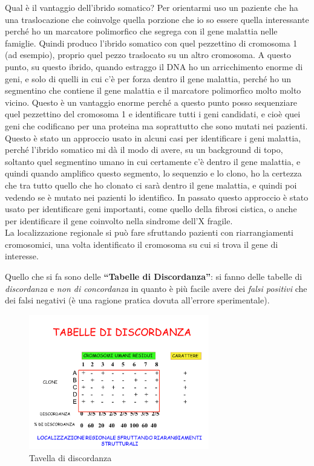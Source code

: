 \documentclass[11pt]{book}
\begin{document}
Qual è il vantaggio dell’ibrido somatico?
Per orientarmi uso un paziente che ha una traslocazione che coinvolge quella porzione che io so essere quella interessante perché ho un marcatore polimorfico che segrega con il gene malattia nelle famiglie.
Quindi produco l’ibrido somatico con quel pezzettino di cromosoma 1 (ad esempio), proprio quel pezzo traslocato su un altro cromosoma.
A questo punto, su questo ibrido, quando estraggo il DNA ho un arricchimento enorme di geni, e solo di quelli in cui c’è per forza dentro il gene malattia, perché ho un segmentino che contiene il gene malattia e il marcatore polimorfico molto molto vicino. Questo è un vantaggio enorme perché a questo punto posso sequenziare quel pezzettino del cromosoma 1 e identificare tutti i geni candidati, e cioè quei geni che codificano per una proteina ma soprattutto che sono mutati nei pazienti.
Questo è stato un approccio usato in alcuni casi per identificare i geni malattia, perché l’ibrido somatico mi dà il modo di avere, su un background di topo, soltanto quel segmentino umano in cui certamente c’è dentro il gene malattia, e quindi quando amplifico questo segmento, lo sequenzio e lo clono, ho la certezza che tra tutto quello che ho clonato ci sarà dentro il gene malattia, e quindi poi vedendo se è mutato nei pazienti lo identifico.
In passato questo approccio è stato usato per identificare geni importanti, come quello della fibrosi cistica, o anche per identificare il gene coinvolto nella sindrome dell'X fragile.\\
La localizzazione regionale si può fare sfruttando pazienti con riarrangiamenti cromosomici, una volta identificato il cromosoma su cui si trova il gene di interesse.

Quello che si fa sono delle \textbf{``Tabelle di Discordanza''}: si fanno delle tabelle di \emph{discordanza} e \emph{non di concordanza} in quanto è più facile avere dei \emph{falsi positivi} che dei falsi negativi (è una ragione pratica dovuta all’errore sperimentale).

\begin{figure}
    \includegraphics[width=0.7\textwidth]{img/34_tabelle_discordanza.png}
  \caption{Tavella di discordanza}
\end{figure}
\end{document}
